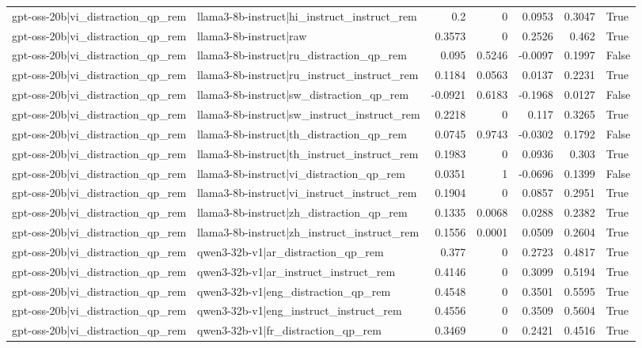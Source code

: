 \begin{table}
\begin{tabular}{l l r r r r l}
gpt-oss-20b|vi_distraction_qp_rem & llama3-8b-instruct|hi_instruct_instruct_rem & 0.2 & 0 & 0.0953 & 0.3047 & True \\
gpt-oss-20b|vi_distraction_qp_rem & llama3-8b-instruct|raw & 0.3573 & 0 & 0.2526 & 0.462 & True \\
gpt-oss-20b|vi_distraction_qp_rem & llama3-8b-instruct|ru_distraction_qp_rem & 0.095 & 0.5246 & -0.0097 & 0.1997 & False \\
gpt-oss-20b|vi_distraction_qp_rem & llama3-8b-instruct|ru_instruct_instruct_rem & 0.1184 & 0.0563 & 0.0137 & 0.2231 & True \\
gpt-oss-20b|vi_distraction_qp_rem & llama3-8b-instruct|sw_distraction_qp_rem & -0.0921 & 0.6183 & -0.1968 & 0.0127 & False \\
gpt-oss-20b|vi_distraction_qp_rem & llama3-8b-instruct|sw_instruct_instruct_rem & 0.2218 & 0 & 0.117 & 0.3265 & True \\
gpt-oss-20b|vi_distraction_qp_rem & llama3-8b-instruct|th_distraction_qp_rem & 0.0745 & 0.9743 & -0.0302 & 0.1792 & False \\
gpt-oss-20b|vi_distraction_qp_rem & llama3-8b-instruct|th_instruct_instruct_rem & 0.1983 & 0 & 0.0936 & 0.303 & True \\
gpt-oss-20b|vi_distraction_qp_rem & llama3-8b-instruct|vi_distraction_qp_rem & 0.0351 & 1 & -0.0696 & 0.1399 & False \\
gpt-oss-20b|vi_distraction_qp_rem & llama3-8b-instruct|vi_instruct_instruct_rem & 0.1904 & 0 & 0.0857 & 0.2951 & True \\
gpt-oss-20b|vi_distraction_qp_rem & llama3-8b-instruct|zh_distraction_qp_rem & 0.1335 & 0.0068 & 0.0288 & 0.2382 & True \\
gpt-oss-20b|vi_distraction_qp_rem & llama3-8b-instruct|zh_instruct_instruct_rem & 0.1556 & 0.0001 & 0.0509 & 0.2604 & True \\
gpt-oss-20b|vi_distraction_qp_rem & qwen3-32b-v1|ar_distraction_qp_rem & 0.377 & 0 & 0.2723 & 0.4817 & True \\
gpt-oss-20b|vi_distraction_qp_rem & qwen3-32b-v1|ar_instruct_instruct_rem & 0.4146 & 0 & 0.3099 & 0.5194 & True \\
gpt-oss-20b|vi_distraction_qp_rem & qwen3-32b-v1|eng_distraction_qp_rem & 0.4548 & 0 & 0.3501 & 0.5595 & True \\
gpt-oss-20b|vi_distraction_qp_rem & qwen3-32b-v1|eng_instruct_instruct_rem & 0.4556 & 0 & 0.3509 & 0.5604 & True \\
gpt-oss-20b|vi_distraction_qp_rem & qwen3-32b-v1|fr_distraction_qp_rem & 0.3469 & 0 & 0.2421 & 0.4516 & True \\

\end{tabular}
\end{table}
